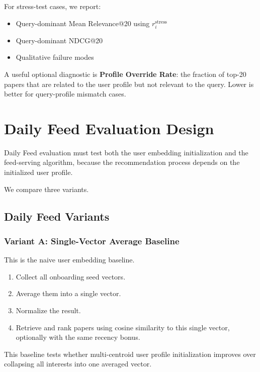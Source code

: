 \documentclass[11pt]{article}
\begin{document}
For stress-test cases, we report:

\begin{itemize}[leftmargin=*]
    \item Query-dominant Mean Relevance@20 using $r_i^{\text{stress}}$
    \item Query-dominant NDCG@20
    \item Qualitative failure modes
\end{itemize}

A useful optional diagnostic is \textbf{Profile Override Rate}: the fraction of top-20 papers that are related to the user profile but not relevant to the query. Lower is better for query-profile mismatch cases.

\section{Daily Feed Evaluation Design}

Daily Feed evaluation must test both the user embedding initialization and the feed-serving algorithm, because the recommendation process depends on the initialized user profile.

We compare three variants.

\subsection{Daily Feed Variants}

\subsubsection*{Variant A: Single-Vector Average Baseline}

This is the naive user embedding baseline.

\begin{enumerate}[leftmargin=*]
    \item Collect all onboarding seed vectors.
    \item Average them into a single vector.
    \item Normalize the result.
    \item Retrieve and rank papers using cosine similarity to this single vector, optionally with the same recency bonus.
\end{enumerate}

This baseline tests whether multi-centroid user profile initialization improves over collapsing all interests into one averaged vector.
\end{document}
